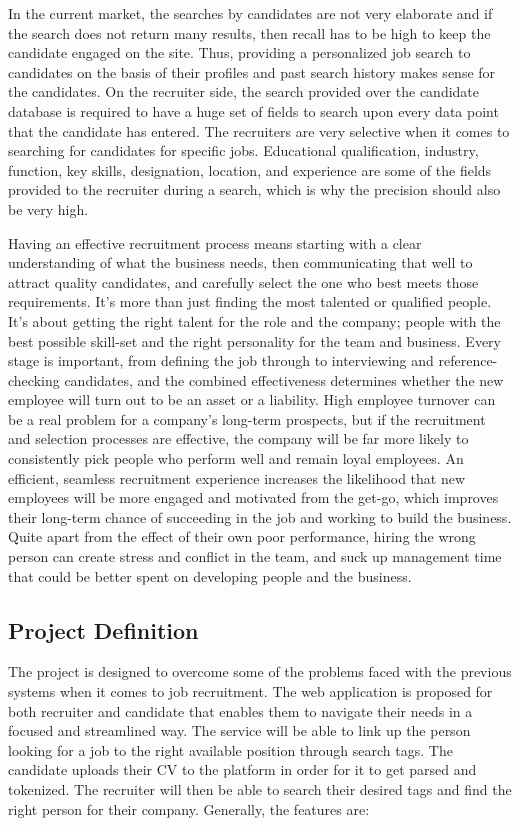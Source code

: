 In the current market, the searches by candidates are not very elaborate and if the search does not return many results, then recall has to be high to keep the candidate engaged on the site. Thus, providing a personalized job search to candidates on the basis of their profiles and past search history makes sense for the candidates. On the recruiter side, the search provided over the candidate database is required to have a huge set of fields to search upon every data point that the candidate has entered. The recruiters are very selective when it comes to searching for candidates for specific jobs. Educational qualification, industry, function, key skills, designation, location, and experience are some of the fields provided to the recruiter during a search, which is why the precision should also be very high. 
\\
\par Having an effective recruitment process means starting with a clear understanding of what the business needs, then communicating that well to attract quality candidates, and carefully select the one who best meets those requirements. It’s more than just finding the most talented or qualified people. It’s about getting the right talent for the role and the company; people with the best possible skill-set and the right personality for the team and business. Every stage is important, from defining the job through to interviewing and reference-checking candidates, and the combined effectiveness determines whether the new employee will turn out to be an asset or a liability. High employee turnover can be a real problem for a company’s long-term prospects, but if the recruitment and selection processes are effective, the company will be far more likely to consistently pick people who perform well and remain loyal employees. An efficient, seamless recruitment experience increases the likelihood that new employees will be more engaged and motivated from the get-go, which improves their long-term chance of succeeding in the job and working to build the business. Quite apart from the effect of their own poor performance, hiring the wrong person can create stress and conflict in the team, and suck up management time that could be better spent on developing people and the business.

\subsection{Project Definition}

\par The project is designed to overcome some of the problems faced with the previous systems when it comes to job recruitment. The web application is proposed for both recruiter and candidate that enables them to navigate their needs in a focused and streamlined way. The service will be able to link up the person looking for a job to the right available position through search tags. The candidate uploads their CV to the platform in order for it to get parsed and tokenized. The recruiter will then be able to search their desired tags and find the right person for their company. Generally, the features are:

